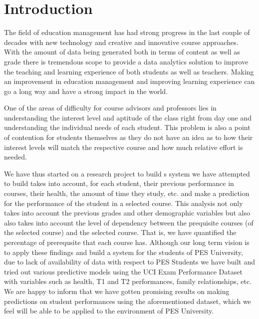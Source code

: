 \documentclass[conference]{IEEEtran}
\begin{document}
	\section{Introduction}
The field of education management has had strong progress in the last couple of decades with new technology and creative and innovative course approaches. With the amount of data being generated both in terms of content as well as grade there is tremendous scope to provide a data analytics solution to improve the teaching and learning experience of both students as well as teachers. Making an improvement in education management and improving learning experience can go a long way and have a strong impact in the world.

One of the areas of difficulty for course advisors and professors lies in understanding the interest level and aptitude of the class right from day one and understanding the individual needs of each student. This problem is also a point of contention for students themselves as they do not have an idea as to how their interest levels will match the respective course and how much relative effort is needed. 

We have thus started on a research project to build s system we have attempted to build takes into account, for each student, their previous performance in courses, their health, the amount of time they study, etc. and make a prediction for the performance of the student in a selected course. This analysis not only takes into account the previous grades and other demographic variables but also also takes into account the level of dependency between the prequisite courses (of the selected course) and the selected course. That is, we have quantified the percentage of prerequsite that each course has. Although our long term vision is to apply these findings and build a system for the students of PES University, due to lack of availability of data with respect to PES Students we have built and tried out various predictive models using the UCI Exam Performance Dataset \cite{Lichman:2013}\cite{ref:4} with variables such as health, T1 and T2 performances, family relationships, etc. We are happy to inform that we have gotten promising results on making predictions on student performances using the aforementioned dataset, which we feel will be able to be applied to the environment of PES University.
\end{document}
